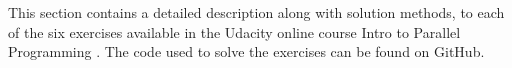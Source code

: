 This section contains a detailed description along with solution methods, to each of the six exercises available in the Udacity online course Intro to Parallel Programming \cite{udacity:parallel}. The code used to solve the exercises can be found on GitHub\cite{exercises}.